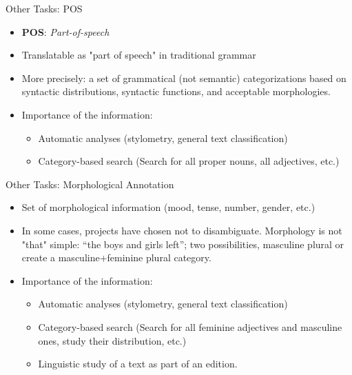 \documentclass[aspectratio=169]{beamer}
\begin{document}
\begin{frame}{Other Tasks: POS}

\begin{itemize}
    \item \textbf{POS}: \textit{Part-of-speech}
    \item Translatable as "part of speech" in traditional grammar
    \item More precisely: a set of grammatical (not semantic) categorizations based on syntactic distributions, syntactic functions, and acceptable morphologies.
    \item Importance of the information: \begin{itemize}
        \item Automatic analyses (stylometry, general text classification)
        \item Category-based search (Search for all proper nouns, all adjectives, etc.)
    \end{itemize}
\end{itemize}
    
\end{frame}

\begin{frame}{Other Tasks: Morphological Annotation}

\begin{itemize}
    \item Set of morphological information (mood, tense, number, gender, etc.)
    \item In some cases, projects have chosen not to disambiguate. Morphology is not "that" simple: “the boys and girls left”; two possibilities, masculine plural or create a masculine+feminine plural category.
    \item Importance of the information: \begin{itemize}
        \item Automatic analyses (stylometry, general text classification)
        \item Category-based search (Search for all feminine adjectives and masculine ones, study their distribution, etc.)
        \item Linguistic study of a text as part of an edition.
    \end{itemize}
\end{itemize}
    
\end{frame}
\end{document}
